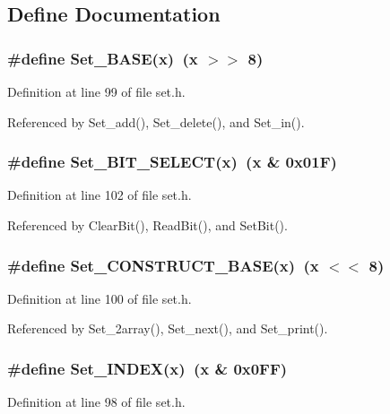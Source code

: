 \subsection{Define Documentation}
\subsubsection{\setlength{\rightskip}{0pt plus 5cm}\#define Set\_\-BASE(x)~(x $>$$>$ 8)}\label{set_8h_c4ced3f8d4c0d3451d548665f3733667}




Definition at line 99 of file set.h.

Referenced by Set\_\-add(), Set\_\-delete(), and Set\_\-in().
\subsubsection{\setlength{\rightskip}{0pt plus 5cm}\#define Set\_\-BIT\_\-SELECT(x)~(x \& 0x01F)}\label{set_8h_210c7cb559fcb8a2f723320e695e4c77}




Definition at line 102 of file set.h.

Referenced by Clear\-Bit(), Read\-Bit(), and Set\-Bit().
\subsubsection{\setlength{\rightskip}{0pt plus 5cm}\#define Set\_\-CONSTRUCT\_\-BASE(x)~(x $<$$<$ 8)}\label{set_8h_e900d06b1bdb772a045691a7ab3380f3}




Definition at line 100 of file set.h.

Referenced by Set\_\-2array(), Set\_\-next(), and Set\_\-print().
\subsubsection{\setlength{\rightskip}{0pt plus 5cm}\#define Set\_\-INDEX(x)~(x \& 0x0FF)}\label{set_8h_8d18b3da22598b962d49f775eb4647ee}




Definition at line 98 of file set.h.

